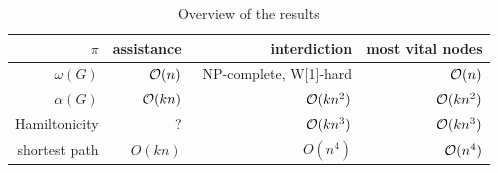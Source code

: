 \begin{table}
\centering
\setlength{\tabcolsep}{6pt}
\begin{tabular}{r|rrr}
$\pi$ & assistance & interdiction & most vital nodes\\
\hline
$\omega(G)$ & $\mathcal{O}(n)$ & \ NP-complete, W[1]-hard & $\mathcal{O}(n)$ \cite{diner2018contractionDeletionBlockers} \\
$\alpha(G)$ & $\mathcal{O}(kn)$ & $\mathcal{O}(kn^2)$ & $\mathcal{O}(k n^2)$\\
Hamiltonicity & ? & $\mathcal{O}(kn^3)$ & $\mathcal{O}(k n^3)$\\
shortest path & $O(kn)$ & $O(n^4)$ & $\mathcal{O}(n^4)$
\end{tabular}
\caption{Overview of the results}
\label{tab:result-overview}
\end{table}



